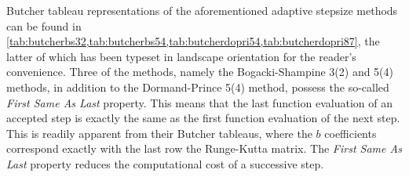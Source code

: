 Butcher tableau representations of the aforementioned adaptive stepsize methods
can be found in
\cref{tab:butcherbs32,tab:butcherbs54,tab:butcherdopri54,tab:butcherdopri87},
the latter of which has been typeset in landscape orientation for the reader's
convenience. Three of the methods, namely the Bogacki-Shampine 3(2) and 5(4)
methods, in addition to the Dormand-Prince 5(4) method, possess the so-called
\emph{First Same As Last} property. This means that the last function evaluation
of an accepted step is exactly the same as the first function evaluation of the
next step. This is readily apparent from their Butcher tableaus, where the
$b$ coefficients correspond exactly with the last row the Runge-Kutta matrix.
The \emph{First Same As Last} property reduces the computational
cost of a successive step.



\vspace{\fill}








